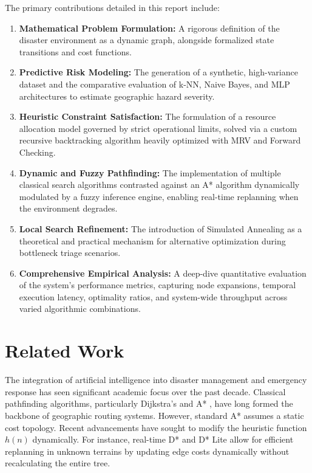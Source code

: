 \documentclass[conference]{IEEEtran}
\begin{document}
The primary contributions detailed in this report include:
\begin{enumerate}
    \item \textbf{Mathematical Problem Formulation:} A rigorous definition of the disaster environment as a dynamic graph, alongside formalized state transitions and cost functions.
    \item \textbf{Predictive Risk Modeling:} The generation of a synthetic, high-variance dataset and the comparative evaluation of k-NN, Naive Bayes, and MLP architectures to estimate geographic hazard severity.
    \item \textbf{Heuristic Constraint Satisfaction:} The formulation of a resource allocation model governed by strict operational limits, solved via a custom recursive backtracking algorithm heavily optimized with MRV and Forward Checking.
    \item \textbf{Dynamic and Fuzzy Pathfinding:} The implementation of multiple classical search algorithms contrasted against an A* algorithm dynamically modulated by a fuzzy inference engine, enabling real-time replanning when the environment degrades.
    \item \textbf{Local Search Refinement:} The introduction of Simulated Annealing as a theoretical and practical mechanism for alternative optimization during bottleneck triage scenarios.
    \item \textbf{Comprehensive Empirical Analysis:} A deep-dive quantitative evaluation of the system's performance metrics, capturing node expansions, temporal execution latency, optimality ratios, and system-wide throughput across varied algorithmic combinations.
\end{enumerate}

\section{Related Work}

The integration of artificial intelligence into disaster management and emergency response has seen significant academic focus over the past decade. Classical pathfinding algorithms, particularly Dijkstra's and A* \cite{hart1968}, have long formed the backbone of geographic routing systems. However, standard A* assumes a static cost topology. Recent advancements have sought to modify the heuristic function $h(n)$ dynamically. For instance, real-time D* and D* Lite allow for efficient replanning in unknown terrains by updating edge costs dynamically without recalculating the entire tree.
\end{document}
